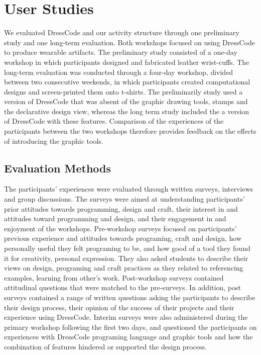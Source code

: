 \documentclass{sigchi}
\begin{document}
\section{User Studies}
We evaluated DressCode and our activity structure through one preliminary study and one long-term evaluation. Both workshops focused on using DressCode to produce wearable artifacts. The preliminary study consisted of a one-day workshop in which participants designed and fabricated leather wrist-cuffs. The long-term evaluation was conducted through a four-day workshop, divided between two consecutive weekends, in which participants created computational designs and screen-printed them onto t-shirts. The preliminarily study used a version of DressCode that was absent of the graphic drawing tools, stamps and the declarative design view, whereas the long term study included the a version of DressCode with these features. Comparison of the experiences of the participants between the two workshops therefore provides feedback on the effects of introducing the graphic tools.

\subsection{Evaluation Methods}
The participants' experiences were evaluated through written surveys, interviews and group discussions. The surveys were aimed at understanding participants' prior attitudes towards programming, design and craft, their interest in and attitudes toward programming and design, and their engagement in and enjoyment of the workshops. Pre-workshop surveys focused on participants' previous experience and attitudes towards programing, craft and design, how personally useful they felt programing to be, and how good of a tool they found it for creativity, personal expression. They also asked students to describe their views on design, programing and craft practices as they related to referencing examples, learning from other's work. Post-workshop surveys contained attitudinal questions that were matched to the pre-surveys. In addition, post surveys contained a range of written questions asking the participants to describe their design process, their opinion of the success of their projects and their experience using DressCode. Interim surveys were also administered during the primary workshop following the first two days, and questioned the participants on experiences with DressCode programing language and graphic tools and how the combination of features hindered or supported the design process.
\end{document}
